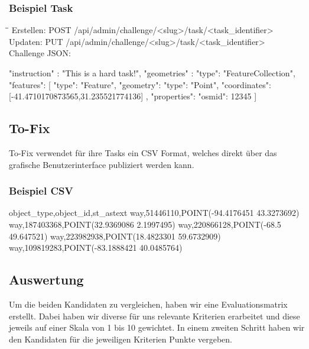 \subsubsection{Beispiel Task}
\begin{tabbing}
    \hspace*{4cm}\=\hspace*{5cm}\= \kill
    Erstellen: \> POST /api/admin/challenge/<slug>/task/<task\_identifier> \\
    Updaten: \> PUT /api/admin/challenge/<slug>/task/<task\_identifier> \\
    Challenge JSON: \\
\end{tabbing}
\begin{python}
{ 
  "instruction" : "This is a hard task!",
  "geometries" : {
    "type": "FeatureCollection",
    "features": [
      { "type": "Feature",
        "geometry": 
        { "type": "Point", 
          "coordinates":[-41.4710170873565,31.235521774136]
        },
        "properties": {"osmid": 12345}
      }
    ]
  }
}
\end{python}	

\subsection{To-Fix}
\Gls{To-Fix} verwendet für ihre Tasks ein CSV Format, welches direkt über das grafische Benutzerinterface publiziert werden kann.
\subsubsection{Beispiel CSV}
\begin{python}
object_type,object_id,st_astext
way,51446110,POINT(-94.4176451 43.3273692)
way,187403368,POINT(32.9369086 2.1997495)
way,220866128,POINT(-68.5 49.647521)
way,223982938,POINT(18.4823301 59.6732909)
way,109819283,POINT(-83.1888421 40.0485764)
\end{python}

\newpage

\subsection{Auswertung}
Um die beiden Kandidaten zu vergleichen, haben wir eine Evaluationsmatrix erstellt. Dabei haben wir diverse für uns relevante Kriterien erarbeitet und diese jeweils auf einer Skala von 1 bis 10 gewichtet.
In einem zweiten Schritt haben wir den Kandidaten für die jeweiligen Kriterien Punkte vergeben.\\

